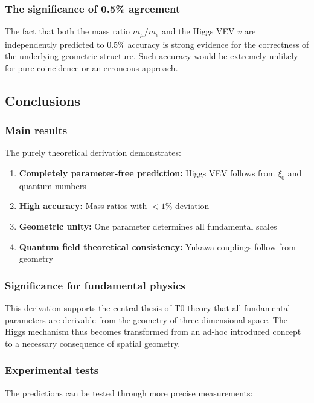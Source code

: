 \documentclass[12pt,a4paper]{article}
\begin{document}
\subsubsection{The significance of 0.5\% agreement}

The fact that both the mass ratio $m_\mu/m_e$ and the Higgs VEV $v$ are independently predicted to 0.5\% accuracy is strong evidence for the correctness of the underlying geometric structure. Such accuracy would be extremely unlikely for pure coincidence or an erroneous approach.

\subsection{Conclusions}

\subsubsection{Main results}

The purely theoretical derivation demonstrates:

\begin{enumerate}
	\item \textbf{Completely parameter-free prediction:} Higgs VEV follows from $\xi_0$ and quantum numbers
	\item \textbf{High accuracy:} Mass ratios with $< 1\%$ deviation
	\item \textbf{Geometric unity:} One parameter determines all fundamental scales
	\item \textbf{Quantum field theoretical consistency:} Yukawa couplings follow from geometry
\end{enumerate}

\subsubsection{Significance for fundamental physics}

This derivation supports the central thesis of T0 theory that all fundamental parameters are derivable from the geometry of three-dimensional space. The Higgs mechanism thus becomes transformed from an ad-hoc introduced concept to a necessary consequence of spatial geometry.

\subsubsection{Experimental tests}

The predictions can be tested through more precise measurements:
\end{document}
